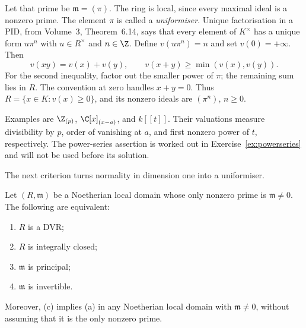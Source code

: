 Let that prime be $\mathfrak m=(\pi)$. The ring is local, since every maximal ideal is a nonzero prime. The element $\pi$ is called a \emph{uniformiser}. Unique factorisation in a PID, from Volume~3, Theorem~6.14, says that every element of $K^\times$ has a unique form $u\pi^n$ with $u\in R^\times$ and $n\in\Z$. Define $v(u\pi^n)=n$ and set $v(0)=+\infty$. Then
\[
 v(xy)=v(x)+v(y),\qquad
 v(x+y)\ge\min(v(x),v(y)).
\]
For the second inequality, factor out the smaller power of $\pi$; the remaining sum lies in $R$. The convention at zero handles $x+y=0$. Thus $R=\{x\in K:v(x)\ge0\}$, and its nonzero ideals are $(\pi^n)$, $n\ge0$.

Examples are $\Z_{(p)}$, $\C[x]_{(x-a)}$, and $k[[t]]$. Their valuations measure divisibility by $p$, order of vanishing at $a$, and first nonzero power of $t$, respectively. The power-series assertion is worked out in Exercise~\ref{ex:powerseries} and will not be used before its solution.

The next criterion turns normality in dimension one into a uniformiser.

\begin{theorem}\label{thm:dvr}
Let $(R,\mathfrak m)$ be a Noetherian local domain whose only nonzero prime is $\mathfrak m\ne0$. The following are equivalent:
\begin{enumerate}[label=(\alph*)]
\item $R$ is a DVR;
\item $R$ is integrally closed;
\item $\mathfrak m$ is principal;
\item $\mathfrak m$ is invertible.
\end{enumerate}
Moreover, (c) implies (a) in any Noetherian local domain with $\mathfrak m\ne0$, without assuming that it is the only nonzero prime.
\end{theorem}

